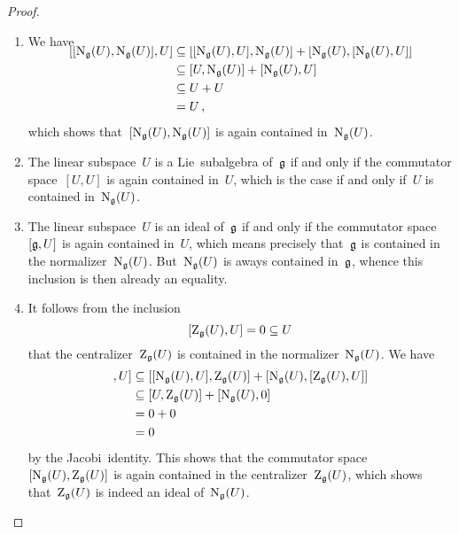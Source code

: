\begin{proof}
	\leavevmode
	\begin{enumerate}
		\item
			We have
			\begin{align*}
				\SwapAboveDisplaySkip
				[ [ \normallie_{\glie}(U), \normallie_{\glie}(U) ], U ]
				&\subseteq
				[ [ \normallie_{\glie}(U), U ], \normallie_{\glie}(U) ]
				+ [ \normallie_{\glie}(U), [ \normallie_{\glie}(U), U ] ]
				\\
				&\subseteq
				[ U, \normallie_{\glie}(U) ]
				+ [ \normallie_{\glie}(U), U ]
				\\
				&\subseteq
				U + U
				\\
				&=
				U \,,
			\end{align*}
			which shows that~$[ \operatorname{N}_{\mathfrak{g}}(U), \operatorname{N}_{\mathfrak{g}}(U) ]$ is again contained in~$\operatorname{N}_{\mathfrak{g}}(U)$.
		\item
			The linear subspace~$U$ is a Lie~subalgebra of~$\mathfrak{g}$ if and only if the commutator space~$[ U, U ]$ is again contained in~$U$, which is the case if and only if~$U$ is contained in~$\operatorname{N}_{\mathfrak{g}}(U)$.
		\item
			The linear subspace~$U$ is an ideal of~$\mathfrak{g}$ if and only if the commutator space~$[\mathfrak{g}, U]$ is again contained in~$U$, which means precisely that~$\mathfrak{g}$ is contained in the normalizer~$\operatorname{N}_{\mathfrak{g}}(U)$.
			But~$\operatorname{N}_{\mathfrak{g}}(U)$ is aways contained in~$\mathfrak{g}$, whence this inclusion is then already an equality.
		\item
			It follows from the inclusion
			\[
				[\operatorname{Z}_{\mathfrak{g}}(U), U]
				=
				0
				\subseteq
				U
			\]
			that the centralizer~$\operatorname{Z}_{\mathfrak{g}}(U)$ is contained in the normalizer~$\operatorname{N}_{\mathfrak{g}}(U)$.
			We have
			\begin{align*}
				[ [ \normallie_{\glie}(U), \centerlie_{\glie}(U) ], U ]
				&\subseteq
				[ [\normallie_{\glie}(U), U], \centerlie_{\glie}(U) ]
				+ [ \normallie_{\glie}(U), [\centerlie_{\glie}(U),  U] ]
				\\
				&\subseteq
				[ U, \centerlie_{\glie}(U) ]
				+ [ \normallie_{\glie}(U), 0 ]
				\\
				&=
				0 + 0
				\\
				&=
				0
			\end{align*}
			by the Jacobi~identity.
			This shows that the commutator space~$[ \operatorname{N}_{\mathfrak{g}}(U), \operatorname{Z}_{\mathfrak{g}}(U) ]$ is again contained in the centralizer~$\operatorname{Z}_{\mathfrak{g}}(U)$, which shows that~$\operatorname{Z}_{\mathfrak{g}}(U)$ is indeed an ideal of~$\operatorname{N}_{\mathfrak{g}}(U)$.
		\qedhere
	\end{enumerate}
\end{proof}





